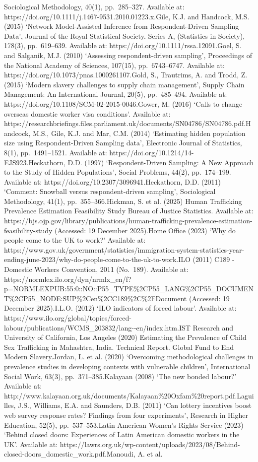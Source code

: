 \documentclass[
  12pt,
  letterpaper,
  DIV=11,
  numbers=noendperiod]{scrartcl}
\begin{document}
{{Sociological Methodology, 40(1), pp.~285--327. Available at: https://doi.org/10.1111/j.1467-9531.2010.01223.x.Gile, K.J. and Handcock, M.S. (2015) `Network Model-Assisted Inference from Respondent-Driven Sampling Data', Journal of the Royal Statistical Society. Series A, (Statistics in Society), 178(3), pp.~619--639. Available at: https://doi.org/10.1111/rssa.12091.Goel, S. and Salganik, M.J. (2010) `Assessing respondent-driven sampling', Proceedings of the National Academy of Sciences, 107(15), pp.~6743--6747. Available at: https://doi.org/10.1073/pnas.1000261107.Gold, S., Trautrims, A. and Trodd, Z. (2015) `Modern slavery challenges to supply chain management', Supply Chain Management: An International Journal, 20(5), pp.~485--494. Available at: https://doi.org/10.1108/SCM-02-2015-0046.Gower, M. (2016) `Calls to change overseas domestic worker visa conditions'. Available at: https://researchbriefings.files.parliament.uk/documents/SN04786/SN04786.pdf.Handcock, M.S., Gile, K.J. and Mar, C.M. (2014) `Estimating hidden population size using Respondent-Driven Sampling data', Electronic Journal of Statistics, 8(1), pp.~1491--1521. Available at: https://doi.org/10.1214/14-EJS923.Heckathorn, D.D. (1997) `Respondent-Driven Sampling: A New Approach to the Study of Hidden Populations', Social Problems, 44(2), pp.~174--199. Available at: https://doi.org/10.2307/3096941.Heckathorn, D.D. (2011) `Comment: Snowball versus respondent-driven sampling', Sociological Methodology, 41(1), pp.~355--366.Hickman, S. et al. (2025) Human Trafficking Prevalence Estimation Feasibility Study \textbar{} Bureau of Justice Statistics. Available at: https://bjs.ojp.gov/library/publications/human-trafficking-prevalence-estimation-feasibility-study (Accessed: 19 December 2025).Home Office (2023) `Why do people come to the UK to work?' Available at: https://www.gov.uk/government/statistics/immigration-system-statistics-year-ending-june-2023/why-do-people-come-to-the-uk-to-work.ILO (2011) C189 - Domestic Workers Convention, 2011 (No.~189). Available at: https://normlex.ilo.org/dyn/nrmlx\_en/f?p=NORMLEXPUB:55:0::NO::P55\_TYPE\%2CP55\_LANG\%2CP55\_DOCUMENT\%2CP55\_NODE:SUP\%2Cen\%2CC189\%2C\%2FDocument (Accessed: 19 December 2025).I.L.O. (2012) `ILO indicators of forced labour'. Available at: https://www.ilo.org/global/topics/forced-labour/publications/WCMS\_203832/lang-\/-en/index.htm.IST Research and University of California, Los Angeles (2020) Estimating the Prevalence of Child Sex Trafficking in Mahashtra, India. Technical Report. Global Fund to End Modern Slavery.Jordan, L. et al. (2020) `Overcoming methodological challenges in prevalence studies in developing contexts with vulnerable children', International Social Work, 63(3), pp.~371--385.Kalayaan (2008) `The new bonded labour?' Available at: http://www.kalayaan.org.uk/documents/Kalayaan\%20Oxfam\%20report.pdf.Laguilles, J.S., Williams, E.A. and Saunders, D.B. (2011) `Can lottery incentives boost web survey response rates? Findings from four experiments', Research in Higher Education, 52(5), pp.~537--553.Latin American Women's Rights Service (2023) `Behind closed doors: Experiences of Latin American domestic workers in the UK'. Available at: https://lawrs.org.uk/wp-content/uploads/2023/08/Behind-closed-doors\_domestic\_work.pdf.Manoudi, A. et al. }}
\end{document}
